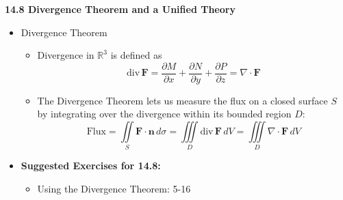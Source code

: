\documentclass[12pt]{article}
\renewcommand{\vec}[1]{\mathbf{#1}}
\newcommand{\veck}{\mathbf{k}}
\newcommand{\<}{\left<}
\renewcommand{\>}{\right>}
\begin{document}
  \newpage
  
  \centerline{\bf 14.8 Divergence Theorem and a Unified Theory}
  
  \begin{itemize}
    
  \item Divergence Theorem
  
    \begin{itemize}
    \item Divergence in $\mathbb{R}^3$ is defined as \[\textrm{div}\,\vec{F} = \frac{\partial M}{\partial x}+\frac{\partial N}{\partial y}+\frac{\partial P}{\partial z} = \nabla \cdot \vec{F} \]
    \item The Divergence Theorem lets us measure the flux on a closed surface $S$ by integrating over the divergence within its bounded region $D$: \[\text{Flux} = \iint\limits_S \vec{F}\cdot\vec{n}\,d\sigma = \iiint\limits_D \textrm{div}\,\vec{F}\,dV= \iiint\limits_D \nabla\cdot\vec{F}\,dV\]
    \end{itemize}
    
  
        
  \item \textbf{Suggested Exercises for 14.8:}
  
    \begin{itemize}
    \item Using the Divergence Theorem: 5-16
    \end{itemize}
    
  \end{itemize}
\end{document}

